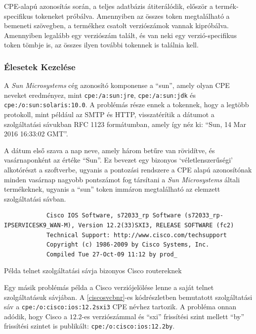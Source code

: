 \documentclass[a4paper,12pt]{article}
\begin{document}
	CPE-alapú azonosítás során, a teljes adatbázis átiterálódik, először a termék-specifikus tokeneket próbálva. Amennyiben az összes token megtalálható a bemeneti szövegben, a termékhez csatolt verziószámok vannak kipróbálva. Amennyiben legalább egy verziószám talált, és van neki egy verzió-specifikus token tömbje is, az összes ilyen további tokennek is találnia kell.
	
\subsubsection{Élesetek Kezelése} \label{ssec:cpeedges}

	A \textit{Sun Microsystems} cég azonosító komponense a ``sun'', amely olyan CPE neveket eredményez, mint \texttt{cpe:/a:sun:jre}, \texttt{cpe:/a:sun:jdk} és \texttt{cpe:/o:sun:solaris:10.0}. A problémás része ennek a tokennek, hogy a legtöbb protokoll, mint például az SMTP és HTTP, visszatérítik a dátumot a szolgáltatási sávukban RFC 1123 formátumban\cite{rfc2616}, amely így néz ki: ``Sun, 14 Mar 2016 16:33:02 GMT''.
	
	A dátum első szava a nap neve, amely három betűre van rövidítve, és vasárnaponként az értéke ``Sun''. Ez bevezet egy bizonyos `véletlenszerűségi' alkotórészt a szoftverbe, ugyanis a pontozási rendszere a CPE alapú azonosítónak minden vasárnap nagyobb pontszámot fog társítani a \textit{Sun Microsystems} általi termékeknek, ugyanis a ``sun'' token immáron megtalálható az elemzett szolgáltatási sávban.
	
	\begin{listing}[H]
		\begin{verbatim}
			Cisco IOS Software, s72033_rp Software (s72033_rp-IPSERVICESK9_WAN-M), Version 12.2(33)SXI3, RELEASE SOFTWARE (fc2)
			Technical Support: http://www.cisco.com/techsupport
			Copyright (c) 1986-2009 by Cisco Systems, Inc.
			Compiled Tue 27-Oct-09 11:12 by prod_
		\end{verbatim}
		\caption{Példa telnet szolgáltatási sávja bizonyos Cisco routereknek}
		\label{ciscosvcbnr}
	\end{listing}

	Egy másik problémás példa a Cisco verziójelölése lenne a saját telnet szolgáltatásuk sávjában. A \ref{ciscosvcbnr}-es kódrészletben bemutatott szolgáltatási sáv a \texttt{cpe:/o:cisco:ios:12.2sxi3} CPE névhez tartozik. A probléma onnan adódik, hogy Cisco a $12.2$-es verziószámmal és ``sxi'' frissítési szint mellett ``by'' frissítési szintet is publikált: \texttt{cpe:/o:cisco:ios:12.2by}.
	
\end{document}
